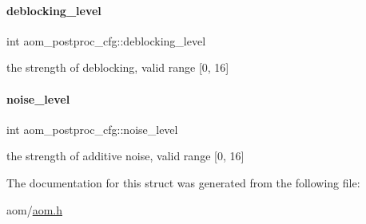 \paragraph{\texorpdfstring{deblocking\+\_\+level}{deblocking\_level}}
{\footnotesize\ttfamily int aom\+\_\+postproc\+\_\+cfg\+::deblocking\+\_\+level}

the strength of deblocking, valid range \mbox{[}0, 16\mbox{]} \mbox{\label{structaom__postproc__cfg_aa68fb341be4d3de6d4feb66d3b659c26}} 
\paragraph{\texorpdfstring{noise\+\_\+level}{noise\_level}}
{\footnotesize\ttfamily int aom\+\_\+postproc\+\_\+cfg\+::noise\+\_\+level}

the strength of additive noise, valid range \mbox{[}0, 16\mbox{]} 

The documentation for this struct was generated from the following file\+:\begin{DoxyCompactItemize}
\item 
aom/\hyperlink{aom_8h}{aom.\+h}\end{DoxyCompactItemize}

